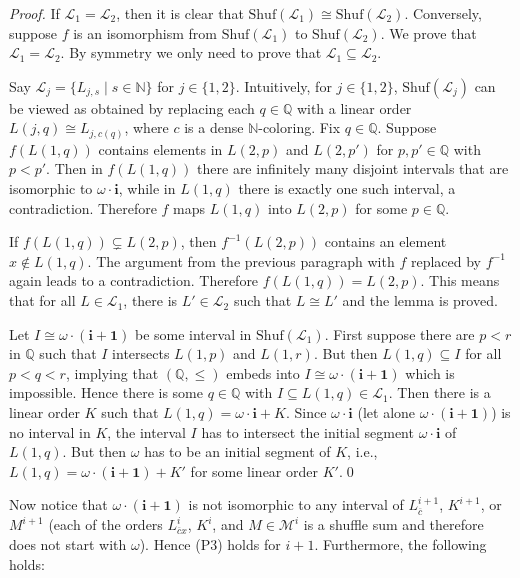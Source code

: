 \documentclass[envcountsame]{llncs}
\renewcommand{\L}{\mathcal L}
\newcommand{\N}{\mathbb N}
\newcommand{\M}{\mathcal M}
\renewcommand{\L}{\mathcal L}
\newcommand{\Q}{\mathbb Q}
\newcommand{\Shuf}{\mathrm{Shuf}}
\begin{document}
\begin{proof} If $\L_1=\L_2$, then it is clear that $\Shuf(\L_1)\cong
  \Shuf(\L_2)$. Conversely, suppose $f$ is an isomorphism from
  $\Shuf(\L_1)$ to $\Shuf(\L_2)$. We prove that $\L_1=\L_2$. By
  symmetry we only need to prove that $\L_1\subseteq \L_2$.

  Say $\L_j=\{L_{j,s}\mid s\in \N \}$ for $j\in \{1,2\}$. Intuitively,
  for $j\in \{1,2\}$, $\Shuf(\L_j)$ can be viewed as obtained by
  replacing each $q\in \Q$ with a linear order $L(j,q)\cong
  L_{j,c(q)}$, where $c$ is a dense $\N$-coloring.  Fix $q\in
  \Q$. Suppose $f(L(1,q))$ contains elements in $L(2,p)$ and $L(2,p')$
  for $p,p'\in \Q$ with $p<p'$. Then in $f(L(1,q))$ there are
  infinitely many disjoint intervals that are isomorphic to $\omega\cdot
  \mathbf{i}$, while in $L(1,q)$ there is exactly one such interval, a
  contradiction. Therefore $f$ maps $L(1,q)$ into $L(2,p)$ for some
  $p\in \Q$.

  If $f(L(1,q)) \varsubsetneq L(2,p)$, then $f^{-1}(L(2,p))$ contains
  an element $x\notin L(1,q)$.  The argument from the previous
  paragraph with $f$ replaced by $f^{-1}$ again leads to a
  contradiction.  Therefore $f(L(1,q))=L(2,p)$. This means that for
  all $L\in \L_1$, there is $L'\in \L_2$ such that $L\cong L'$ and the
  lemma is proved.

  Let $I\cong\omega\cdot(\mathbf{i+1})$ be some interval in
  $\Shuf(\L_1)$. First suppose there are $p<r$ in $\Q$ such that $I$
  intersects $L(1,p)$ and $L(1,r)$. But then $L(1,q)\subseteq I$ for
  all $p<q<r$, implying that $(\Q,\le)$ embeds into
  $I\cong\omega\cdot(\mathbf{i+1})$ which is impossible.  Hence there
  is some $q\in\Q$ with $I\subseteq L(1,q)\in\L_1$. Then there is a
  linear order $K$ such that $L(1,q)=\omega\cdot\mathbf{i}+K$. Since
  $\omega\cdot\mathbf{i}$ (let alone $\omega\cdot(\mathbf{i+1})$) is
  no interval in $K$, the interval $I$ has to intersect the initial
  segment $\omega\cdot\mathbf{i}$ of $L(1,q)$. But then $\omega$ has
  to be an initial segment of $K$, i.e.,
  $L(1,q)=\omega\cdot(\mathbf{i+1})+K'$ for some linear order
  $K'$.\qed
\end{proof}
Now notice that $\omega\cdot \mathbf{(i+1)}$ is not isomorphic to any interval of 
$L^{i+1}_{\overline{c}}$, $K^{i+1}$, or $M^{i+1}$ (each of the orders $L^i_{\overline{c}x}$, $K^i$, and $M \in \M^i$ is a shuffle sum
and therefore does not start with $\omega$). 
Hence (P3) holds for $i+1$. 
Furthermore, the following holds:
\end{document}
